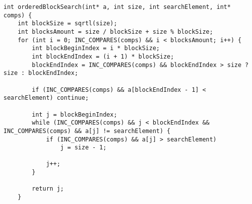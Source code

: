 \documentclass[a4paper,14pt]{extarticle}
\begin{document}
\begin{enumerate}
\begin{verbatim}
int orderedBlockSearch(int* a, int size, int searchElement, int* comps) {
    int blockSize = sqrtl(size);
    int blocksAmount = size / blockSize + size % blockSize;
    for (int i = 0; INC_COMPARES(comps) && i < blocksAmount; i++) {
        int blockBeginIndex = i * blockSize;
        int blockEndIndex = (i + 1) * blockSize;
        blockEndIndex = INC_COMPARES(comps) && blockEndIndex > size ? size : blockEndIndex;

        if (INC_COMPARES(comps) && a[blockEndIndex - 1] < searchElement) continue;

        int j = blockBeginIndex;
        while (INC_COMPARES(comps) && j < blockEndIndex && INC_COMPARES(comps) && a[j] != searchElement) {
            if (INC_COMPARES(comps) && a[j] > searchElement)
                j = size - 1;
            
            j++;
        }

        return j;
    }


\end{verbatim}
\end{enumerate}
\end{document}

